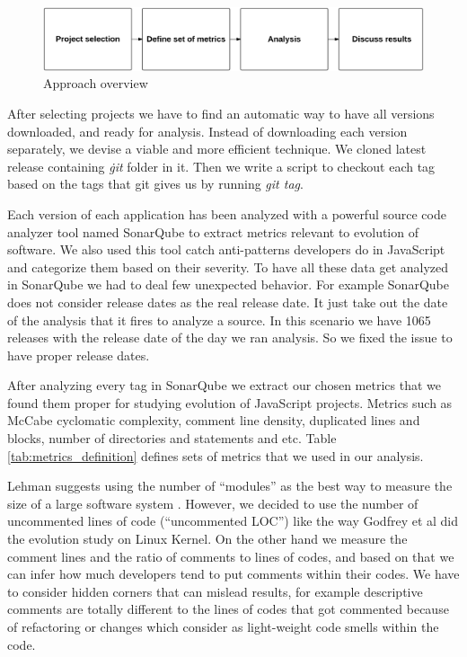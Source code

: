  \begin{figure}[thb!]
 	\caption{Approach overview}
 	\centering
 	\label{fig:approach_overview}
 	\includegraphics[width=1\textwidth]{figures/approach_overview}
 \end{figure}
After selecting projects we have to find an automatic way to have all versions downloaded, and ready for analysis. Instead of downloading each version separately, we devise a viable and more efficient technique. We cloned latest release containing \textit{\.git} folder in it. Then we write a script to checkout each tag based on the tags that git gives us by running \textit{git tag}.
\par
Each version of each application has been analyzed with a powerful source code analyzer tool named SonarQube to extract metrics relevant to evolution of software. We also used this tool catch anti-patterns developers do in JavaScript and categorize them based on their severity.
To have all these data get analyzed in SonarQube we had to deal few unexpected behavior. For example SonarQube does not consider release dates as the real release date. It just take out the date of the analysis that it fires to analyze a source. In this scenario we have 1065 releases with the release date of the day we ran analysis. So we fixed the issue to have proper release dates.



\par After analyzing every tag in SonarQube we extract our chosen metrics that we found them proper for studying evolution of JavaScript projects. Metrics such as McCabe cyclomatic complexity,  comment line density, duplicated lines and blocks, number of directories and statements and etc. Table  \ref{tab:metrics_definition} defines sets of metrics that we used in our analysis.



\par
Lehman suggests using the number of “modules” as the best way to measure the size of a large software system \cite{Lehman1997METRICS}. However, we decided to use the number of uncommented lines of code (“uncommented LOC”) like the way Godfrey et al \cite{Godfrey2000ICMS} did the evolution study on Linux Kernel. On the other hand we measure the comment lines and the ratio of comments to lines of codes, and based on that we can infer how much developers tend to put comments within their codes. We have to consider hidden corners that can mislead results, for example descriptive comments are totally different to the lines of codes that got commented because of refactoring or changes which consider as light-weight code smells within the code.

